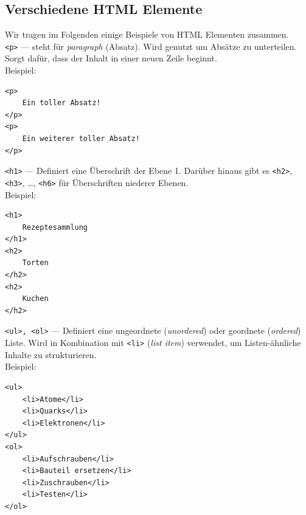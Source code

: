 \documentclass[ngerman,11pt]{article}
\begin{document}

    \subsection{Verschiedene HTML Elemente}

    Wir tragen im Folgenden einige Beispiele von HTML Elementen zusammen. \\

    \verb_<p>_ --- steht für \textit{paragraph} (Absatz).
    Wird genutzt um Absätze zu unterteilen.
    Sorgt dafür, dass der Inhalt in einer neuen Zeile beginnt. \\

    Beispiel:

    \begin{lstlisting}[style=htmlcssjs]
<p>
    Ein toller Absatz!
</p>
<p>
    Ein weiterer toller Absatz!
</p>
    \end{lstlisting}

    \vspace{0.5cm}

    \verb_<h1>_ --- Definiert eine Überschrift der Ebene 1.
    Darüber hinaus gibt es \verb_<h2>_, \verb_<h3>_, \dots, \verb_<h6>_ für Überschriften
    niederer Ebenen. \\

    Beispiel:

    \begin{lstlisting}[style=htmlcssjs]
<h1>
    Rezeptesammlung
</h1>
<h2>
    Torten
</h2>
<h2>
    Kuchen
</h2>
    \end{lstlisting}

    \vspace{0.5cm}

    \verb_<ul>, <ol>_ --- Definiert eine ungeordnete (\textit{unordered}) oder geordnete (\textit{ordered}) Liste.
    Wird in Kombination mit \verb_<li>_ (\textit{list item}) verwendet, um Listen-ähnliche Inhalte zu strukturieren. \\

    Beispiel:

    \begin{lstlisting}[style=htmlcssjs]
<ul>
    <li>Atome</li>
    <li>Quarks</li>
    <li>Elektronen</li>
</ul>
<ol>
    <li>Aufschrauben</li>
    <li>Bauteil ersetzen</li>
    <li>Zuschrauben</li>
    <li>Testen</li>
</ol>
    \end{lstlisting}
\end{document}
